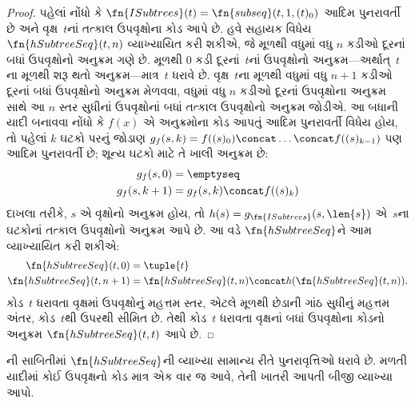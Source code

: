 \documentclass[../../../include/open-logic-section]{subfiles}
\begin{document}
\begin{proof}
  પહેલાં નોંધો કે $\fn{ISubtrees}(t) = \fn{subseq}(t, 1, (t)_0)$
  આદિમ પુનરાવર્તી છે અને વૃક્ષ~$t$નાં તત્કાલ ઉપવૃક્ષોના કોડ આપે
  છે. હવે સહાયક વિધેય $\fn{hSubtreeSeq}(t,n)$ વ્યાખ્યાયિત કરી
  શકીએ, જે મૂળથી વધુમાં વધુ $n$ કડીઓ દૂરનાં બધાં ઉપવૃક્ષોનો
  અનુક્રમ ગણે છે. મૂળથી $0$ કડી દૂરનાં~$t$નાં ઉપવૃક્ષોનો
  અનુક્રમ---અર્થાત્~$t$ના મૂળથી શરૂ થતો અનુક્રમ---માત્ર~$t$ ધરાવે છે.
  વૃક્ષ~$t$ના મૂળથી વધુમાં વધુ $n+1$ કડીઓ દૂરનાં બધાં ઉપવૃક્ષોનો
  અનુક્રમ મેળવવા, વધુમાં વધુ $n$ કડીઓ દૂરનાં ઉપવૃક્ષોના અનુક્રમ
  સાથે આ $n$ સ્તર સુધીનાં ઉપવૃક્ષોનાં બધાં તત્કાલ ઉપવૃક્ષોનો
  અનુક્રમ જોડીએ. આ બધાની યાદી બનાવવા નોંધો કે
  $f(x)$ એ અનુક્રમોના કોડ આપતું આદિમ પુનરાવર્તી વિધેય હોય, તો
  પહેલાં $k$ ઘટકો પરનું જોડાણ $g_f(s, k) = f((s)_0) \concat
  \dots \concat f((s)_{k-1})$ પણ આદિમ પુનરાવર્તી છે; શૂન્ય
  ઘટકો માટે તે ખાલી અનુક્રમ છે:
    \begin{align*}
      g_f(s, 0) & = \emptyseq\\
      g_f(s, k+1) & = g_f(s, k) \concat f((s)_k)
    \end{align*}
    દાખલા તરીકે, $s$ એ વૃક્ષોનો અનુક્રમ હોય, તો
    $h(s) = g_{\fn{ISubtrees}}(s, \len{s})$ એ~$s$ના ઘટકોનાં
    તત્કાલ ઉપવૃક્ષોનો અનુક્રમ આપે છે. આ વડે $\fn{hSubtreeSeq}$ને
    આમ વ્યાખ્યાયિત કરી શકીએ:
    \begin{align*}
      \fn{hSubtreeSeq}(t, 0) & = \tuple{t} \\
      \fn{hSubtreeSeq}(t, n+1) & = \fn{hSubtreeSeq}(t, n) \concat
      h(\fn{hSubtreeSeq}(t, n)).
    \end{align*}
    કોડ~$t$ ધરાવતા વૃક્ષમાં ઉપવૃક્ષોનું મહત્તમ સ્તર, એટલે મૂળથી
    છેડાની ગાંઠ સુધીનું મહત્તમ અંતર, કોડ~$t$થી ઉપરથી સીમિત છે.
    તેથી કોડ~$t$ ધરાવતા વૃક્ષનાં બધાં ઉપવૃક્ષોના કોડનો અનુક્રમ
    $\fn{hSubtreeSeq}(t, t)$ આપે છે.
\end{proof}

\begin{prob}
  ની સાબિતીમાં
  $\fn{hSubtreeSeq}$ની વ્યાખ્યા સામાન્ય રીતે પુનરાવૃત્તિઓ
  ધરાવે છે. મળતી યાદીમાં કોઈ ઉપવૃક્ષનો કોડ માત્ર એક વાર જ આવે,
  તેની ખાતરી આપતી બીજી વ્યાખ્યા આપો.
\end{prob}
\end{document}
